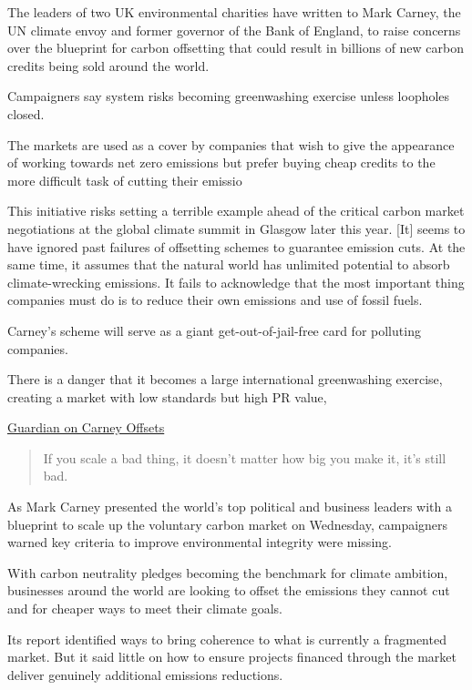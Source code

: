 \documentclass[
]{book}
\begin{document}
The leaders of two UK environmental charities have written to Mark Carney, the UN climate envoy and former governor of the Bank of England, to raise concerns over the blueprint for carbon offsetting that could result in billions of new carbon credits being sold around the world.

Campaigners say system risks becoming greenwashing exercise unless loopholes closed.

The markets are used as a cover by companies that wish to give the appearance of working towards net zero emissions but prefer buying cheap credits to the more difficult task of cutting their emissio

This initiative risks setting a terrible example ahead of the critical carbon market negotiations at the global climate summit in Glasgow later this year. {[}It{]} seems to have ignored past failures of offsetting schemes to guarantee emission cuts. At the same time, it assumes that the natural world has unlimited potential to absorb climate-wrecking emissions. It fails to acknowledge that the most important thing companies must do is to reduce their own emissions and use of fossil fuels.

Carney's scheme will serve as a giant get-out-of-jail-free card for polluting companies.

There is a danger that it becomes a large international greenwashing exercise, creating a market with low standards but high PR value,

\href{https://www.theguardian.com/environment/2021/jan/27/green-groups-raise-concerns-over-carney-carbon-credits-plan}{Guardian on Carney Offsets}

\begin{quote}
If you scale a bad thing, it doesn't matter how big you make it, it's still bad.
\end{quote}

As Mark Carney presented the world's top political and business leaders with a blueprint to scale up the voluntary carbon market on Wednesday, campaigners warned key criteria to improve environmental integrity were missing.

With carbon neutrality pledges becoming the benchmark for climate ambition, businesses around the world are looking to offset the emissions they cannot cut and for cheaper ways to meet their climate goals.

Its report identified ways to bring coherence to what is currently a fragmented market. But it said little on how to ensure projects financed through the market deliver genuinely additional emissions reductions.
\end{document}
